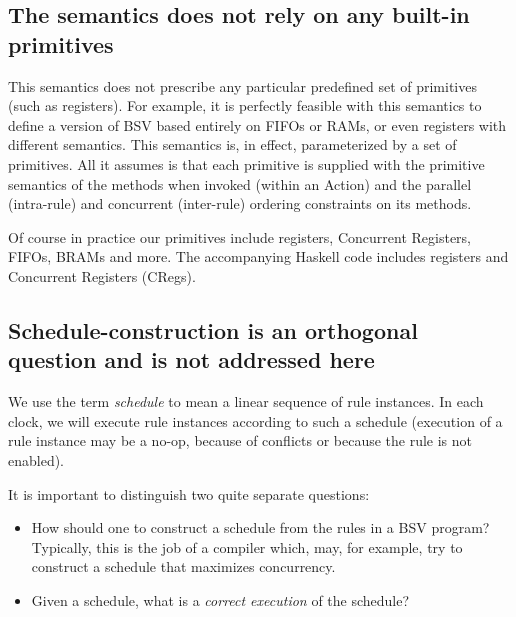 \documentclass[11pt]{article}
\begin{document}

\subsection{The semantics does not rely on any built-in primitives}

This semantics does not prescribe any particular predefined set of
primitives (such as registers).  For example, it is perfectly feasible
with this semantics to define a version of BSV based entirely on FIFOs
or RAMs, or even registers with different semantics.  This semantics
is, in effect, parameterized by a set of primitives.  All it assumes
is that each primitive is supplied with the primitive semantics of the
methods when invoked (within an Action) and the parallel
(intra-rule) and concurrent (inter-rule) ordering constraints on its
methods.

Of course in practice our primitives include registers, Concurrent
Registers, FIFOs, BRAMs and more.  The accompanying Haskell code
includes registers and Concurrent Registers (CRegs).


\subsection{Schedule-construction is an orthogonal question and is not addressed here}

\label{sec_schedules}

We use the term \emph{schedule} to mean a linear sequence of rule
instances.  In each clock, we will execute rule instances according to
such a schedule (execution of a rule instance may be a no-op, because
of conflicts or because the rule is not enabled).

It is important to distinguish two quite separate questions:

\begin{itemize}

\item How should one to construct a schedule from the rules in a BSV
program?  Typically, this is the job of a compiler which, may, for
example, try to construct a schedule that maximizes concurrency.

\item Given a schedule, what is a \emph{correct execution} of the schedule?

\end{itemize}
\end{document}
